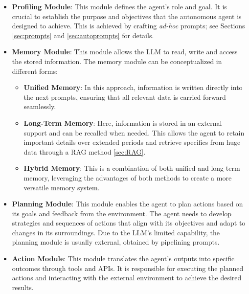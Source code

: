 \begin{itemize}
    \item \textbf{Profiling Module}: This module defines the agent's role and goal. It is crucial to establish the purpose and objectives that the autonomous agent is designed to achieve. This is achieved by crafting \textit{ad-hoc} prompts; see Sections \ref{sec:prompts} and \ref{sec:autoprompts} for details. 

    \item \textbf{Memory Module}: This module allows the LLM to read, write and access the stored information. The memory module can be conceptualized in different forms:
    \begin{itemize}
        \item \textbf{Unified Memory}: In this approach, information is written directly into the next prompts, ensuring that all relevant data is carried forward seamlessly.
        \item \textbf{Long-Term Memory}: Here, information is stored in an external support and can be recalled when needed. This allows the agent to retain important details over extended periods and retrieve specifics from huge data through a RAG method \ref{sec:RAG}.
        \item \textbf{Hybrid Memory}: This is a combination of both unified and long-term memory, leveraging the advantages of both methods to create a more versatile memory system.
    \end{itemize}

    \item \textbf{Planning Module}: This module enables the agent to plan actions based on its goals and feedback from the environment. The agent needs to develop strategies and sequences of actions that align with its objectives and adapt to changes in its surroundings. Due to the LLM's limited capability, the planning module is usually external, obtained by pipelining prompts.

    \item \textbf{Action Module}: This module translates the agent's outputs into specific outcomes through tools and APIs. It is responsible for executing the planned actions and interacting with the external environment to achieve the desired results.
\end{itemize}

